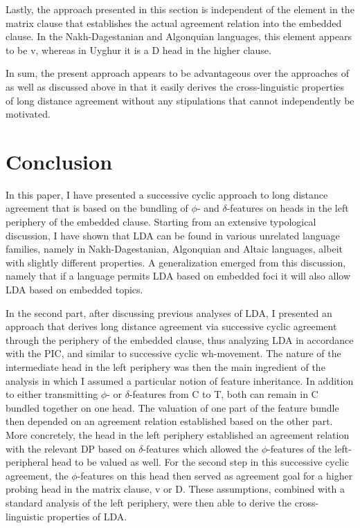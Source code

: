 \documentclass[output=paper
,modfonts
,nonflat]{langsci/langscibook}
\begin{document}
Lastly, the approach presented in this section is independent of the element in the matrix clause that establishes the actual agreement relation into the embedded clause. In the Nakh-Dagestanian and Algonquian languages, this element appears to be v, whereas in Uyghur it is a D head in the higher clause.

In sum, the present approach appears to be advantageous over the approaches of \citet{Polinsky_Potsdam2001} as well as \citet{Bjorkman_Zeijlstra2014} discussed above in that it easily derives the cross-linguistic properties of long distance agreement without any stipulations that cannot independently be motivated.

\section{Conclusion}
\label{sec:mursell:5}

In this paper, I have presented a successive cyclic approach to long distance agreement that is based on the bundling of $ \phi $- and $ \delta $-features on heads in the left periphery of the embedded clause. Starting from an extensive typological discussion, I have shown that LDA can be found in various unrelated language families, namely in Nakh-Dagestanian, Algonquian and Altaic languages, albeit with slightly different properties. A generalization emerged from this discussion, namely that if a language permits LDA based on embedded foci it will also allow LDA based on embedded topics.

In the second part, after discussing previous analyses of LDA, I presented an approach that derives long distance agreement via successive cyclic agreement through the periphery of the embedded clause, thus analyzing LDA in accordance with the PIC, and similar to successive cyclic wh-movement. The nature of the intermediate head in the left periphery was then the main ingredient of the analysis in which I assumed a particular notion of feature inheritance. In addition to either transmitting $ \phi $- or $ \delta $-features from C to T, both can remain in C bundled together on one head. The valuation of one part of the feature bundle then depended on an agreement relation established based on the other part. More concretely, the head in the left periphery established an agreement relation with the relevant DP based on $ \delta $-features which allowed the $ \phi $-features of the left-peripheral head to be valued as well. For the second step in this successive cyclic agreement, the $ \phi $-features on this head then served as agreement goal for a higher probing head in the matrix clause, v or D. These assumptions, combined with a standard analysis of the left periphery, were then able to derive the cross-linguistic properties of LDA.
\end{document}
